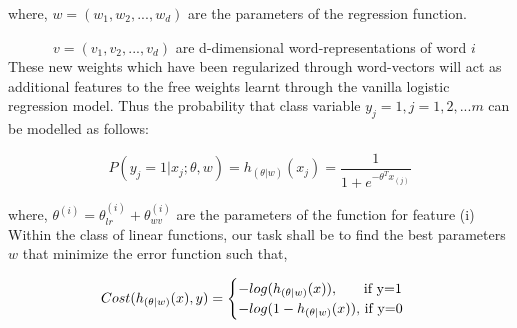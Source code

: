 where, $w = (w_{1}, w_{2}, ..., w_{d})$ are the parameters of the regression function. 

$\quad\qquad\  v= (v_{1}, v_{2}, ..., v_{d})$ are d-dimensional word-representations of word $i$\\

\noindent These new weights which have been regularized through word-vectors will act as additional features to the free weights learnt through the vanilla logistic regression model. Thus the probability that class variable $y_{j}=1, j=1,2,...m$ can be modelled as follows:

\begin{equation}
P(y_{j} = 1 | x_{j}; \theta, w) = h_{(\theta| w)}(x_{j}) = \frac{1}{1+e^{-\theta^{T}x_{(j)}}}
\end{equation}

where, $\theta^{(i)} = \theta_{lr}^{(i)} + \theta_{wv}^{(i)}$ are the parameters of the function for feature (i)\\

\noindent Within the class of linear functions, our task shall be to find the best parameters $w$ that minimize the error function such that,

\begin{equation}\label{cost_fn_eq}
Cost(h_{(\theta| w)}(x), y) = 
\begin{cases}
-log(h_{(\theta| w)}(x)), $\qquad if y=1$
\\
-log(1-h_{(\theta| w)}(x)), $ if y=0$
\end{cases}
\end{equation}\\



